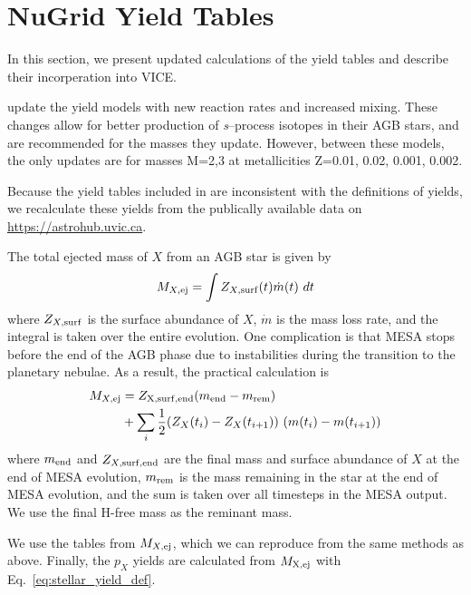 \documentclass[fleqn,
referee, %
usenatbib]{mnras}
\begin{document}
\section{NuGrid Yield Tables} \label{sec:nugrid_yields}
In this section, we present updated calculations of the \citep{battino+19, battino+21} yield tables and describe their incorperation into VICE.

\citep{battino+19, battino+21} update the \citep{ritter+18} yield models with new reaction rates and increased mixing. These changes allow for better production of {\it s}--process isotopes in their AGB stars, and are recommended for the masses they update. However, between these models, the only updates are for masses M=2,3 at metallicities Z=0.01, 0.02, 0.001, 0.002. 

Because the yield tables included in \citep{battino+19, battino+21} are inconsistent with the \citet{ritter+18} definitions of yields, we recalculate these yields from the publically available data on \url{https://astrohub.uvic.ca}. 

The total ejected mass of $X$ from an AGB star is given by 
\begin{equation}
    M_{X, \rm ej} = \int Z_{X, \rm surf}(t) \dot{m}(t)\ dt 
\end{equation}
where $Z_{X, \rm surf}$ is the surface abundance of $X$, $\dot m$ is the mass loss rate, and the integral is taken over the entire evolution. 
One complication is that MESA stops before the end of the AGB phase due to instabilities during the transition to the planetary nebulae. 
As a result, the practical calculation is 
\begin{subequations}
    \begin{align}
        M_{X, \rm ej} &= Z_{\rm X, surf, end} (m_{\rm end} - m_{\rm rem}) \\ 
                      &+ \sum_i \frac{1}{2} (Z_X(t_i) - Z_X(t_{i+1}))\ (m(t_i) - m(t_{i+1}))
    \end{align}
\end{subequations}
where $m_{\rm end}$ and $Z_{X, \rm surf, end}$ are the final mass and surface abundance of $X$ at the end of MESA evolution, $m_{\rm rem}$ is the mass remaining in the star at the end of MESA evolution, and the sum is taken over all timesteps in the MESA output. We use the final H-free mass as the reminant mass. 

We use the \citet{ritter+18} tables from $M_{X, \rm ej}$, which we can reproduce from the same methods as above. Finally, the $p_{X}$ yields are calculated from $M_{\rm X, ej}$ with Eq.~\ref{eq:stellar_yield_def}. 

\bsp	%
\label{lastpage}
\end{document}
